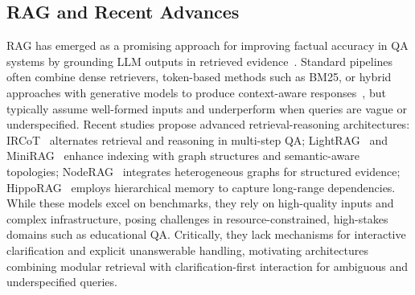 \documentclass[11pt]{article}
\begin{document}
\subsection{RAG and Recent Advances}
RAG has emerged as a promising approach for improving factual accuracy in QA systems by grounding LLM outputs in retrieved evidence~\cite{10.5555/3495724.3496517}. Standard pipelines often combine dense retrievers, token-based methods such as BM25, or hybrid approaches with generative models to produce context-aware responses~\cite{10.1145/3637528.3671470}, but typically assume well-formed inputs and underperform when queries are vague or underspecified. Recent studies propose advanced retrieval-reasoning architectures: IRCoT~\cite{trivedi-etal-2023-interleaving} alternates retrieval and reasoning in multi-step QA; LightRAG~\cite{guo2024lightrag} and MiniRAG~\cite{fan2025minirag} enhance indexing with graph structures and semantic-aware topologies; NodeRAG~\cite{xu2025noderag} integrates heterogeneous graphs for structured evidence; HippoRAG~\cite{gutierrez2024hipporag} employs hierarchical memory to capture long-range dependencies. While these models excel on benchmarks, they rely on high-quality inputs and complex infrastructure, posing challenges in resource-constrained, high-stakes domains such as educational QA. Critically, they lack mechanisms for interactive clarification and explicit unanswerable handling, motivating architectures combining modular retrieval with clarification-first interaction for ambiguous and underspecified queries.
\end{document}
